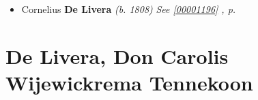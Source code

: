 \documentclass[10pt, openany]{book}
\begin{document}
\begin{itemize}
{\begin{itemize}
{\begin{itemize}
{\begin{itemize}
{\begin{itemize}
{\begin{itemize}
\end{itemize}}
\end{itemize}
  }
\item{Edwin \textbf{De Livera} \textcolor{gray}{\textit{(b. 185?)}}
  }
\end{itemize}}
\end{itemize}
   }
\item{Cornelius \textbf{De Livera} \textcolor{slorange}{\textit{(b. 1808)}} \textcolor{slteal}{\textit{See  \autoref{00001196} \textit{, p. \pageref{00001196} }}}}
\end{itemize}}
\end{itemize}
  
\chapter{De Livera, Don Carolis Wijewickrema Tennekoon}
\label{00001055}
\textcolor{slmaroon}{\textit{}}
\end{document}
